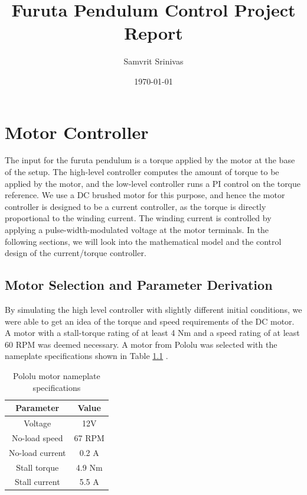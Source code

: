 \documentclass{report}
\title{Furuta Pendulum Control Project Report}
\author{Samvrit Srinivas}
\date{\today}
\begin{document}
\maketitle

\chapter{Motor Controller} \label{chap:motor_controller}

The input for the furuta pendulum is a torque applied by the motor at the base of the setup. The high-level controller computes the amount of torque to be applied by the motor, and the low-level controller runs a PI control on the torque reference. We use a DC brushed motor for this purpose, and hence the motor controller is designed to be a current controller, as the torque is directly proportional to the winding current. The winding current is controlled by applying a pulse-width-modulated voltage at the motor terminals. In the following sections, we will look into the mathematical model and the control design of the current/torque controller.

\section{Motor Selection and Parameter Derivation}	\label{sec:motor_selection}
By simulating the high level controller with slightly different initial conditions, we were able to get an idea of the torque and speed requirements of the DC motor. A motor with a stall-torque rating of at least 4 Nm and a speed rating of at least 60 RPM was deemed necessary. A motor from Pololu was selected with the nameplate specifications shown in Table \ref{table:pololu_specs} \cite{pololu_motor_specs}.


\begin{table}
\begin{center}
\begin{tabular}{|c|c|}
\hline
\textbf{Parameter} & \textbf{Value }\\
\hline\hline
Voltage & 12V \\
\hline
No-load speed & 67 RPM \\
\hline
No-load current & 0.2 A \\
\hline
Stall torque & 4.9 Nm \\
\hline
Stall current & 5.5 A \\
\hline
\end{tabular}
\caption{Pololu motor nameplate specifications} \label{table:pololu_specs}
\end{center}
\end{table}
\end{document}
